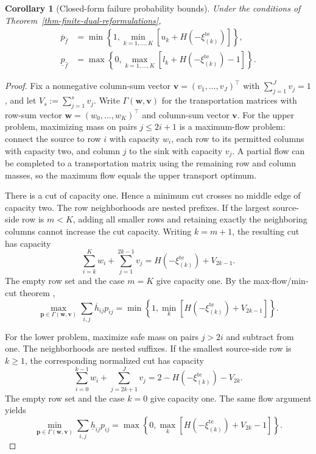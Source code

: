 \documentclass[review,11pt,3p,authoryear,nopreprintline]{elsarticle}
\newtheorem{corollary}{Corollary}
\begin{document}
\begin{corollary}[Closed-form failure probability bounds]
  \label{thm-closed-form-bounds}
  Under the conditions of Theorem~\ref{thm-finite-dual-reformulations},
  \begin{align}
    \overline p_{\hat f}
    &=\min\left\{1,\min_{k=1,\ldots,K}[u_k+H\left(-\xi_{(k)}^{\mathrm{te}}\right)]\right\},
    \label{eq-dw-closed-upper}\\
    \underline p_{\hat f}
    &=\max\left\{0,\max_{k=1,\ldots,K}[l_k+H\left(-\xi_{(k)}^{\mathrm{te}}\right)-1]\right\}.
    \label{eq-dw-closed-lower}
  \end{align}
\end{corollary}
\begin{proof}
  Fix a nonnegative column-sum vector $\bm v=(v_1,\ldots,v_J)^\top$ with $\sum_{j=1}^J v_j=1$, and let $V_s:=\sum_{j=1}^s v_j$. Write $\Gamma(\bm w,\bm v)$ for the transportation matrices with row-sum vector $\bm w=(w_0,\ldots,w_K)^\top$ and column-sum vector $\bm v$. For the upper problem, maximizing mass on pairs $j\le2i+1$ is a maximum-flow problem: connect the source to row $i$ with capacity $w_i$, each row to its permitted columns with capacity two, and column $j$ to the sink with capacity $v_j$. A partial flow can be completed to a transportation matrix using the remaining row and column masses, so the maximum flow equals the upper transport optimum.

  There is a cut of capacity one. Hence a minimum cut crosses no middle edge of capacity two. The row neighborhoods are nested prefixes. If the largest source-side row is $m<K$, adding all smaller rows and retaining exactly the neighboring columns cannot increase the cut capacity. Writing $k=m+1$, the resulting cut has capacity
  \[
    \sum_{i=k}^K w_i+\sum_{j=1}^{2k-1}v_j
    =H\left(-\xi_{(k)}^{\mathrm{te}}\right)+V_{2k-1}.
  \]
  The empty row set and the case $m=K$ give capacity one. By the max-flow/min-cut theorem \citep{F.F56},
  \begin{equation}
    \max_{\bm p\in\Gamma(\bm w,\bm v)}
      \sum_{i,j}\overline h_{ij}p_{ij}
    =\min\left\{1,\min_k[H\left(-\xi_{(k)}^{\mathrm{te}}\right)+V_{2k-1}]\right\}.
    \label{eq-fixed-column-upper}
  \end{equation}

  For the lower problem, maximize safe mass on pairs $j>2i$ and subtract from one. The neighborhoods are nested suffixes. If the smallest source-side row is $k\ge1$, the corresponding normalized cut has capacity
  \[
    \sum_{i=0}^{k-1}w_i+\sum_{j=2k+1}^Jv_j
    =2-H\left(-\xi_{(k)}^{\mathrm{te}}\right)-V_{2k}.
  \]
  The empty row set and the case $k=0$ give capacity one. The same flow argument yields
  \begin{equation}
    \min_{\bm p\in\Gamma(\bm w,\bm v)}
      \sum_{i,j}\underline h_{ij}p_{ij}
    =\max\left\{0,\max_k[H\left(-\xi_{(k)}^{\mathrm{te}}\right)+V_{2k}-1]\right\}.
    \label{eq-fixed-column-lower}
  \end{equation}


\end{proof}
\end{document}

